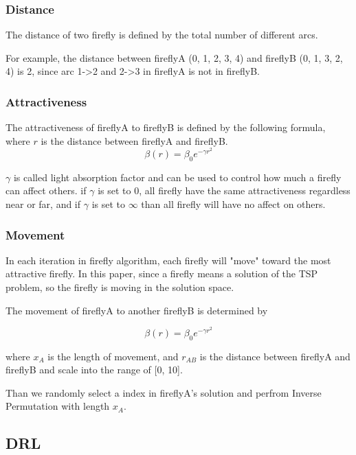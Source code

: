 \documentclass[twocolumn, a4paper]{extarticle}
\begin{document}
\subsubsection{Distance}
The distance of two firefly is defined by the total number of different arcs. 

For example, the distance between fireflyA (0, 1, 2, 3, 4) and fireflyB (0, 1, 3, 2, 4) is 2, since arc 1->2 and 2->3 in fireflyA is not in fireflyB.

\subsubsection{Attractiveness}
The attractiveness of fireflyA to fireflyB is defined by the following formula, where $r$ is the distance between fireflyA and fireflyB.
\begin{equation}
	\beta(r)=\beta_0e^{-\gamma r^2}
\end{equation}


$\gamma$ is called light absorption factor and can be used to control how much a firefly can affect others. if $\gamma$ is set to 0, all firefly have the same attractiveness regardless near or far, and if $\gamma$ is set to $\infty$ than all firefly will have no affect on others.

\subsubsection{Movement}
In each iteration in firefly algorithm, each firefly will "move" toward the most attractive firefly.
In this paper, since a firefly means a solution of the TSP problem, so the firefly is moving in the solution space. 

The movement of fireflyA to another fireflyB is determined by

\begin{equation}
	\beta(r)=\beta_0e^{-\gamma r^2}
\end{equation}

where $x_A$ is the length of movement, and $r_{AB}$ is the distance between fireflyA and fireflyB and scale into the range of [0, 10].

Than we randomly select a index in fireflyA's solution and perfrom Inverse Permutation with length $x_A$.

\subsection{DRL}
\end{document}
